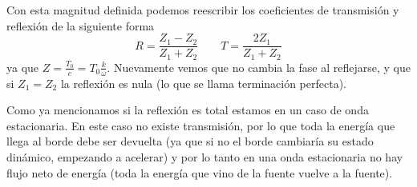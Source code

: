 \documentclass[a4paper,spanish]{article}
\numberwithin{equation}{section}
\begin{document}
			Con esta magnitud definida podemos reescribir los coeficientes de transmisi\'on y reflexi\'on de la siguiente forma
			\begin{equation}
				R = \frac{Z_1 - Z_2}{Z_1 + Z_2} \qquad T = \frac{2 Z_1}{Z_1 + Z_2}
				\label{eq:ondas_reflexion_coeficientes_impedancia}
			\end{equation}
			ya que $Z = \frac{T_0}{c} = T_0 \frac{k}{\omega}$. Nuevamente vemos que no cambia la fase al reflejarse, y que si $Z_1 = Z_2$ la reflexi\'on es nula (lo que se llama terminaci\'on perfecta).
			
			Como ya mencionamos si la reflexi\'on es total estamos en un caso de onda estacionaria. En este caso no existe transmisi\'on, por lo que toda la energ\'ia que llega al borde debe ser devuelta (ya que si no el borde cambiar\'ia su estado din\'amico, empezando a acelerar) y por lo tanto en una onda estacionaria no hay flujo neto de energ\'ia (toda la energ\'ia que vino de la fuente vuelve a la fuente).
\end{document}
